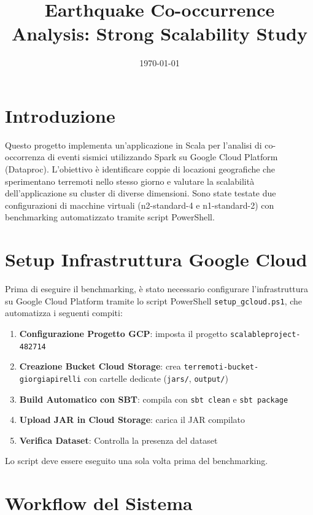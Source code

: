 \documentclass[8pt,a4paper]{article}
\title{Earthquake Co-occurrence Analysis: Strong Scalability Study}
\date{\today}
\begin{document}
\maketitle

\section{Introduzione}
Questo progetto implementa un'applicazione in Scala per l'analisi di co-occorrenza di eventi sismici utilizzando Spark su Google Cloud Platform (Dataproc). L'obiettivo è identificare coppie di locazioni geografiche che sperimentano terremoti nello stesso giorno e valutare la scalabilità dell'applicazione su cluster di diverse dimensioni. Sono state testate due configurazioni di macchine virtuali (n2-standard-4 e n1-standard-2) con benchmarking automatizzato tramite script PowerShell.

\section{Setup Infrastruttura Google Cloud}

Prima di eseguire il benchmarking, è stato necessario configurare l'infrastruttura su Google Cloud Platform tramite lo script PowerShell \texttt{setup\_gcloud.ps1}, che automatizza i seguenti compiti:

\begin{enumerate}
    \item \textbf{Configurazione Progetto GCP}: imposta il progetto \texttt{scalableproject-482714}
    \item \textbf{Creazione Bucket Cloud Storage}: crea \texttt{terremoti-bucket-giorgiapirelli} con cartelle dedicate (\texttt{jars/}, \texttt{output/})
    \item \textbf{Build Automatico con SBT}: compila con \texttt{sbt clean} e \texttt{sbt package}
    \item \textbf{Upload JAR in Cloud Storage}: carica il JAR compilato
    \item \textbf{Verifica Dataset}: Controlla la presenza del dataset
\end{enumerate}

Lo script deve essere eseguito una sola volta prima del benchmarking.

\section{Workflow del Sistema}
\end{document}
